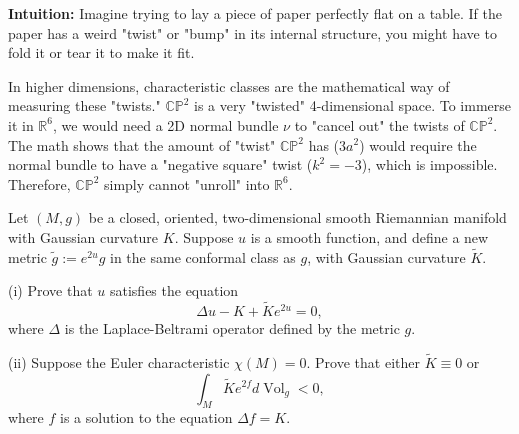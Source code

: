 \begin{solution}
\textbf{Intuition:}
Imagine trying to lay a piece of paper perfectly flat on a table. If the paper has a weird "twist" or "bump" in its internal structure, you might have to fold it or tear it to make it fit. 

In higher dimensions, characteristic classes are the mathematical way of measuring these "twists." $\mathbb{CP}^2$ is a very "twisted" 4-dimensional space. To immerse it in $\mathbb{R}^6$, we would need a 2D normal bundle $\nu$ to "cancel out" the twists of $\mathbb{CP}^2$. The math shows that the amount of "twist" $\mathbb{CP}^2$ has ($3a^2$) would require the normal bundle to have a "negative square" twist ($k^2 = -3$), which is impossible. Therefore, $\mathbb{CP}^2$ simply cannot "unroll" into $\mathbb{R}^6$.
\end{solution}

\begin{exercise}
\label{geometry:2025:5}
Let $(M, g)$ be a closed, oriented, two-dimensional smooth Riemannian manifold with Gaussian curvature $K$. Suppose $u$ is a smooth function, and define a new metric $\widetilde{g} := e^{2u}g$ in the same conformal class as $g$, with Gaussian curvature $\widetilde{K}$.

(i) Prove that $u$ satisfies the equation
\[
\Delta u - K + \widetilde{K}e^{2u} = 0,
\]
where $\Delta$ is the Laplace-Beltrami operator defined by the metric $g$.

(ii) Suppose the Euler characteristic $\chi(M) = 0$. Prove that either $\widetilde{K} \equiv 0$ or
\[
\int_{M} \widetilde{K}e^{2f} d\operatorname{Vol}_{g} < 0,
\]
where $f$ is a solution to the equation $\Delta f = K$.
\end{exercise}

